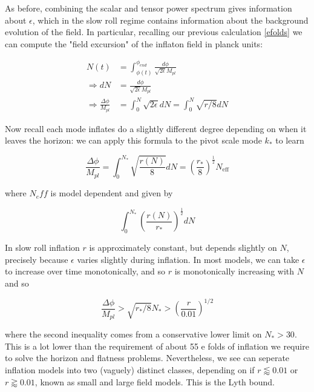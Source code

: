\documentclass[a4paper,10pt]{article}
\newcommand{\Mp}{M_{pl}}
\newcommand{\half}{\frac{1}{2}}
\begin{document}
As before, combining the scalar and tensor power spectrum gives information about $\epsilon$, which in the slow roll regime contains information about the background evolution of the field. In particular, recalling our previous calculation \ref{efolds} we can compute the "field excursion" of the inflaton field in planck units:

\begin{equation}\begin{split}
N(t) &=  \int_{\phi(t)}^{\phi_{end}} \frac{d\phi}{\sqrt{2\epsilon}\Mp}\\
\Rightarrow dN&=\frac{d\phi}{\sqrt{2\epsilon}\Mp}\\
\Rightarrow \frac{\Delta \phi}{\Mp} &= \int_0^N \sqrt{2\epsilon} dN = \int_0^N \sqrt{r/8} dN 
\end{split}\end{equation}

Now recall each mode inflates do a slightly different degree depending on when it leaves the horizon: we can apply this formula to the pivot scale mode $k_*$ to learn 

\begin{equation}
\frac{\Delta \phi}{\Mp} =  \int_0^{N_*} \sqrt{\frac{r(N)}{8}} dN  = (\frac{r_*}{8})^\half N_{\text{eff}}
\end{equation}

where $N_eff$ is model dependent and given by

\begin{equation}
\int_0^{N_*}(\frac{r(N)}{r_*})^\half dN
\end{equation}


In slow roll inflation $r$ is approximately constant, but depends slightly on $N$, precisely because $\epsilon$ varies slightly during inflation. In most models, we can take $\epsilon$ to increase over time monotonically, and so $r$ is monotonically increasing with $N$ and so

\begin{equation}
\frac{\Delta \phi}{\Mp} > \sqrt{r_*/8}N_* > (\frac{r}{0.01})^{1/2}
\end{equation}

where the second inequality comes from a conservative lower limit on $N_* > 30$. This is a lot lower than the requirement of about 55 e folds of inflation we require to solve the horizon and flatness problems. Nevertheless, we see can seperate inflation models into two (vaguely) distinct classes, depending on if $r\lessapprox 0.01$ or $r\gtrapprox 0.01$, known as small and large field models. This is the Lyth bound. \\
\end{document}
